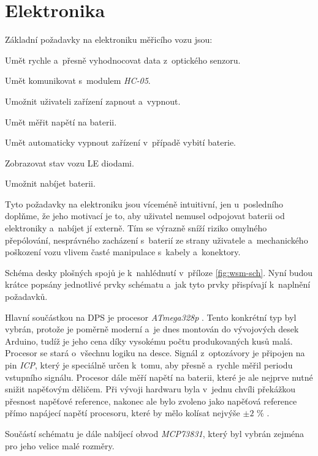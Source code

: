 \section{Elektronika}
\label{sec:wsm-ele}

Základní požadavky na elektroniku měřicího vozu jsou:

\begin{compactenum}
\item Umět rychle a~přesně vyhodnocovat data z~optického senzoru.
\item Umět komunikovat s~modulem \textit{HC-05}.
\item Umožnit uživateli zařízení zapnout a~vypnout.
\item Umět měřit napětí na baterii.
\item Umět automaticky vypnout zařízení v~případě vybití baterie.
\item Zobrazovat stav vozu LE diodami.
\item Umožnit nabíjet baterii.
\end{compactenum}

Tyto požadavky na elektroniku jsou víceméně intuitivní, jen u~posledního
doplňme, že jeho motivací je to, aby uživatel nemusel odpojovat baterii od
elektroniky a~nabíjet jí externě. Tím se výrazně sníží riziko omylného
přepólování, nesprávného zacházení s~baterií ze strany uživatele a~mechanického
poškození vozu vlivem časté manipulace s~kabely a~konektory.

Schéma desky plošných spojů je k~nahlédnutí v~příloze \ref{fig:wsm-sch}. Nyní
budou krátce popsány jednotlivé prvky schématu a~jak tyto prvky přispívají
k~naplnění požadavků.

Hlavní součástkou na DPS je procesor \textit{ATmega328p}
\cite{atmega328p:datasheet}.  Tento konkrétní typ byl vybrán, protože je
poměrně moderní a~je dnes montován do vývojových desek Arduino, tudíž je jeho
cena díky vysokému počtu produkovaných kusů malá. Procesor se stará o~všechnu
logiku na desce.  Signál z~optozávory je připojen na pin \textit{\gls{ICP}}, který je
speciálně určen k~tomu, aby přesně a~rychle měřil periodu vstupního signálu.
Procesor dále měří napětí na baterii, které je ale nejprve nutné snižit
napěťovým děličem. Při vývoji hardwaru byla v~jednu chvíli překážkou přesnost
napěťové reference, nakonec ale bylo zvoleno jako napěťová reference přímo
napájecí napětí procesoru, které by mělo kolísat nejvýše $\pm 2$ \%
\cite{ldo:datasheet}.

Součástí schématu je dále nabíjecí obvod \textit{MCP73831}, který byl vybrán
zejména pro jeho velice malé rozměry.

